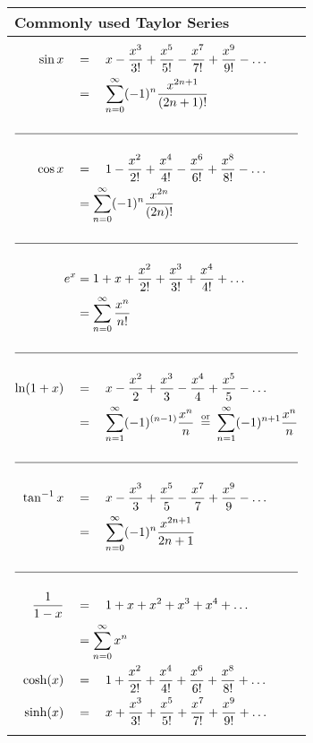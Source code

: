 

	\begin{table}[H]
		\centering
		\renewcommand{\arraystretch}{2.5}
		\begin{tabularx}{0.9\textwidth} { 
				| >{\centering\arraybackslash}X 
				|   }
			\hline
			\rowcolor{ocrel} \large \textbf{Commonly used Taylor Series} \\
			\hline
			\hline \\
			$\begin{aligned}
			\sin x \quad&=\quad x-\frac{x^{3}}{3 !}+\frac{x^{5}}{5 !}-\frac{x^{7}}{7 !}+\frac{x^{9}}{9 !}-\ldots\\
			&=\quad  \sum_{n=0}^{\infty}(-1)^{n} \frac{x^{2 n+1}}{(2 n+1) !}\\\\ \hline \\
	       \cos x  \quad&=\quad1-\frac{x^{2}}{2 !}+\frac{x^{4}}{4 !}-\frac{x^{6}}{6 !}+\frac{x^{8}}{8 !}-\ldots \\
			&=\sum_{n=0}^{\infty}(-1)^{n} \frac{x^{2 n}}{(2 n) !}	\\\\ \hline \\
		    e^{x} &=1+x+\frac{x^{2}}{2 !}+\frac{x^{3}}{3 !}+\frac{x^{4}}{4 !}+\ldots \\
			&=\sum_{n=0}^{\infty} \frac{x^{n}}{n !}	\\\\ \hline \\
			\ln (1+x) \quad&=\quad x-\frac{x^{2}}{2}+\frac{x^{3}}{3}-\frac{x^{4}}{4}+\frac{x^{5}}{5}-\ldots\\
			&=\quad \sum_{n=1}^{\infty}(-1)^{(n-1)} \frac{x^{n}}{n} \stackrel{\text { or }}{=} \sum_{n=1}^{\infty}(-1)^{n+1} \frac{x^{n}}{n}\\\\ \hline \\
			\tan ^{-1} x \quad&=\quad x-\frac{x^{3}}{3}+\frac{x^{5}}{5}-\frac{x^{7}}{7}+\frac{x^{9}}{9}-\ldots\\
			&=\quad  \sum_{n=0}^{\infty}(-1)^{n} \frac{x^{2 n+1}}{2 n+1}\\\\ \hline \\
			\frac{1}{1-x}  \quad&=\quad1+x+x^{2}+x^{3}+x^{4}+\ldots \\
			&=\sum_{n=0}^{\infty} x^{n}\\
			{\cosh}(x) \quad&=\quad1+\frac{x^{2}}{2 !}+\frac{x^{4}}{4 !}+\frac{x^{6}}{6 !}+\frac{x^{8}}{8 !}+\ldots \\
			\sinh (x) \quad&=\quad x+\frac{x^{3}}{3 !}+\frac{x^{5}}{5 !}+\frac{x^{7}}{7 !}+\frac{x^{9}}{9 !}+\ldots
			\end{aligned}$\\\\ \hline
			\end{tabularx}
		
	\end{table}
